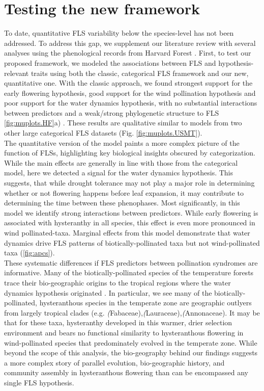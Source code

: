 \documentclass{article}
\begin{document}
{\section*{Testing the new framework}

To date, quantitative FLS variability below the species-level has not been addressed. To address this gap, we supplement our literature review with several analyses using the phenological records from Harvard Forest \citep{OKeefe2015}. First, to test our proposed framework, we modeled the associations between FLS and hypothesis-relevant traits using both the classic, categorical FLS framework and our new, quantitative one. With the classic approach, we found strongest support for the early flowering hypothesis, good support for the wind pollination hypothesis and poor support for the water dynamics hypothesis, with no substantial interactions between predictors and a weak/strong phylogenetic structure to FLS \ref{fig:muplots.HF}a) . These results are qualitative similar to models from two other large categorical FLS datasets (Fig. \ref{fig:muplots.USMT}). \\

\noindent The quantitative version of the model paints a more complex picture of the function of FLSs, highlighting key biological insights obscured by categorization. While the main effects are generally in line with those from the categorical model, here we detected a signal for the water dynamics hypothesis. This suggests, that while drought tolerance may not play a major role in determining whether or not flowering happens before leaf expansion, it may contribute to determining the time between these phenophases. Most significantly, in this model we identify strong interactions between predictors. While early flowering is associated with hysteranthy in all species, this effect is even more pronounced in wind pollinated-taxa. Marginal effects from this model demonstrate that water dynamics drive FLS patterns of biotically-pollinated taxa but not wind-pollinated taxa (\ref{fig:apcs}). \\

These systematic differences if FLS predictors between pollination syndromes are informative. Many of the biotically-pollinated species of the temperature forests trace their bio-geographic origins to the tropical regions \citep{Daubenmire1972} where the water dynamics hypothesis originated \citep{Janzen1967,Franklin2016}. In particular, we see many of the biotically-pollinated, hysteranthous species in the temperate zone are geographic outlyers from largely tropical clades (e.g. \textit(Fabaceae),\textit(Lauraceae),\textit(Annonaceae). It may be that for these taxa, hysteranthy developed in this warmer, drier selection environment and bears no functional similarity to hysteranthous flowering in wind-pollinated species that predominately evolved in the temperate zone. While beyond the scope of this analysis, the bio-geography behind our findings suggests a more complex story of parallel evolution, bio-geographic history, and community assembly in hysteranthous flowering than can be encompassed any single FLS hypothesis.\\

}
\end{document}
